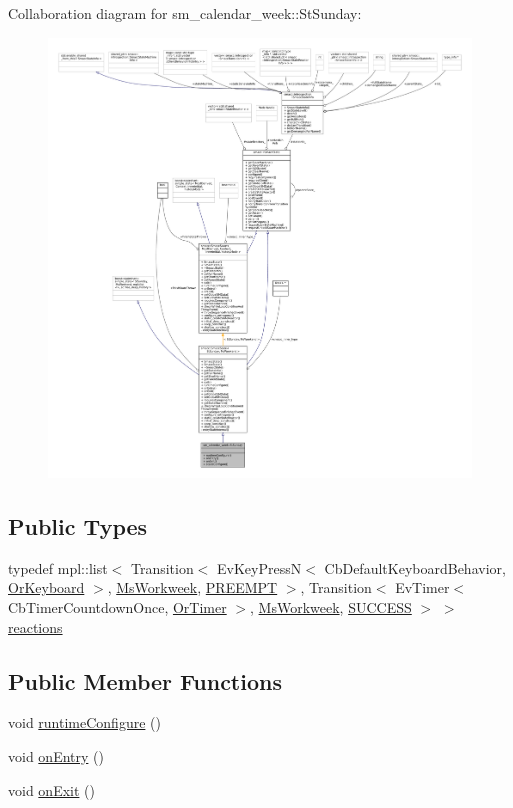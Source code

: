 Collaboration diagram for sm\+\_\+calendar\+\_\+week\+:\+:St\+Sunday\+:
\nopagebreak
\begin{figure}[H]
\begin{center}
\leavevmode
\includegraphics[width=350pt]{structsm__calendar__week_1_1StSunday__coll__graph}
\end{center}
\end{figure}
\subsection*{Public Types}
\begin{DoxyCompactItemize}
\item 
typedef mpl\+::list$<$ Transition$<$ Ev\+Key\+PressN$<$ Cb\+Default\+Keyboard\+Behavior, \hyperlink{classsm__calendar__week_1_1OrKeyboard}{Or\+Keyboard} $>$, \hyperlink{classsm__calendar__week_1_1MsWorkweek}{Ms\+Workweek}, \hyperlink{classPREEMPT}{P\+R\+E\+E\+M\+PT} $>$, Transition$<$ Ev\+Timer$<$ Cb\+Timer\+Countdown\+Once, \hyperlink{classsm__calendar__week_1_1OrTimer}{Or\+Timer} $>$, \hyperlink{classsm__calendar__week_1_1MsWorkweek}{Ms\+Workweek}, \hyperlink{classSUCCESS}{S\+U\+C\+C\+E\+SS} $>$ $>$ \hyperlink{structsm__calendar__week_1_1StSunday_af2828352a507a4c972e43b318bb59a51}{reactions}
\end{DoxyCompactItemize}
\subsection*{Public Member Functions}
\begin{DoxyCompactItemize}
\item 
void \hyperlink{structsm__calendar__week_1_1StSunday_a28c840bf204044472162a7d3f14da28b}{runtime\+Configure} ()
\item 
void \hyperlink{structsm__calendar__week_1_1StSunday_a7b701f2b218ced9fe9b173d8cb3cdd0c}{on\+Entry} ()
\item 
void \hyperlink{structsm__calendar__week_1_1StSunday_aed3b7222b1138a60faeafc6a476d833a}{on\+Exit} ()
\end{DoxyCompactItemize}

